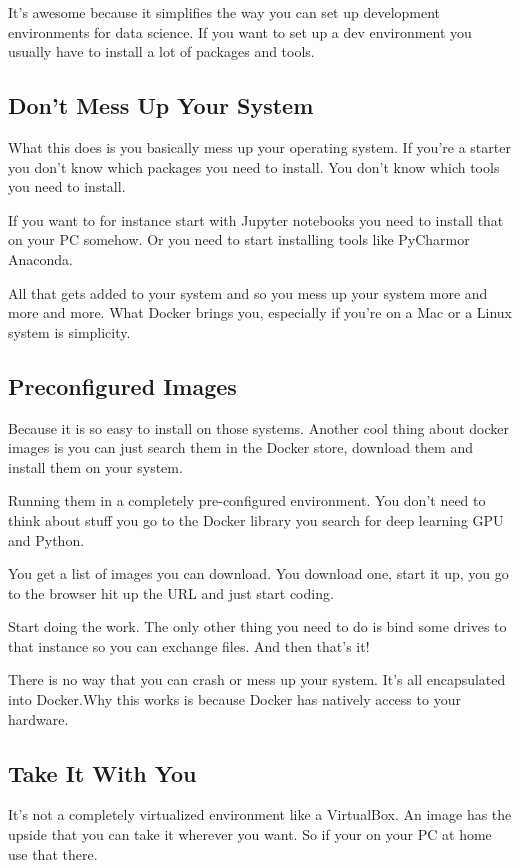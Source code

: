 \documentclass[12pt, numbers=noenddot]{scrreprt} %
\begin{document}
It’s awesome because it simplifies the way you can set up development environments for data science. If you want to set up a dev environment you usually have to install a lot of packages and tools.

\subsection{Don’t Mess Up Your System}

What this does is you basically mess up your operating system. If you’re a starter you don’t know which packages you need to install. You don’t know which tools you need to install.

If you want to for instance start with Jupyter notebooks you need to install that on your PC somehow. Or you need to start installing tools like PyCharmor Anaconda.

All that gets added to your system and so you mess up your system more and more and more. What Docker brings you, especially if you’re on a Mac or a Linux system is simplicity.

\subsection{Preconfigured Images}

Because it is so easy to install on those systems. Another cool thing about docker images is you can just search them in the Docker store, download them and install them on your system.

Running them in a completely pre-configured environment. You don’t need to think about stuff you go to the Docker library you search for deep learning GPU and Python.

You get a list of images you can download. You download one, start it up, you go to the browser hit up the URL and just start coding.

Start doing the work. The only other thing you need to do is bind some drives to that instance so you can exchange files. And then that’s it!

There is no way that you can crash or mess up your system. It’s all encapsulated into Docker.Why this works is because Docker has natively access to your hardware.

\subsection{Take It With You}

It’s not a completely virtualized environment like a VirtualBox. An image has the upside that you can take it wherever you want. So if your on your PC at home use that there.
\end{document}
